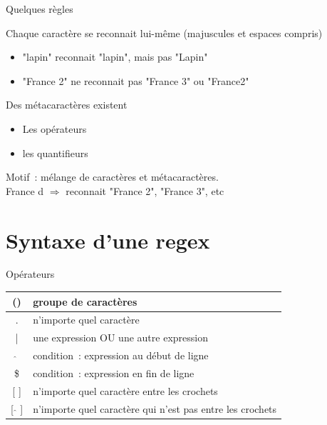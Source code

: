 \documentclass[serif, aspectratio=169]{beamer}
\begin{document}
\begin{frame}{Quelques règles}
    \begin{block}{Chaque caractère se reconnait lui-même (majuscules et espaces compris)}
        \begin{itemize}
            \item "lapin" reconnait "lapin", mais pas "Lapin"
            \item "France 2" ne reconnait pas "France 3" ou "France2"
        \end{itemize}
    \end{block}
    \pause
    \begin{block}{Des métacaractères existent}
        \begin{itemize}
            \item Les opérateurs %
            \item les quantifieurs %
        \end{itemize}
    \end{block}
    \pause
    \begin{center}
        \Large
        Motif~: mélange de caractères et métacaractères. \\
        France \bs d $\Rightarrow$ reconnait "France 2", "France 3", etc
    \end{center}
\end{frame}

\section{Syntaxe d'une regex}

\begin{frame}{Opérateurs}
    \begin{table}
        \renewcommand{\arraystretch}{1.5}  
        \raggedright
        \begin{tabular}{|c|p{10cm}|}
            \hline
            () & groupe de caractères \\
            \hline
            . & n'importe quel caractère \\
            \hline
            | & une expression OU une autre expression \\
            \hline
            $\hat{}$ & condition~: expression au début de ligne \\
            \hline 
            \$ & condition~: expression en fin de ligne \\
            \hline
            {[} {]} & n'importe quel caractère entre les crochets \\
            \hline
            {[} $\hat{}$ {]} & n'importe quel caractère qui n'est pas entre les crochets \\
            \hline
        \end{tabular}
    \end{table}
\end{frame}
\end{document}
